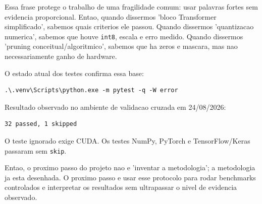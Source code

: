 Essa frase protege o trabalho de uma fragilidade comum: usar palavras fortes sem evidencia proporcional. Entao, quando dissermos 'bloco Transformer simplificado', sabemos quais criterios ele passou. Quando dissermos 'quantizacao numerica', sabemos que houve \texttt{int8}, escala e erro medido. Quando dissermos 'pruning conceitual/algoritmico', sabemos que ha zeros e mascara, mas nao necessariamente ganho de hardware.



O estado atual dos testes confirma essa base:



\begin{Verbatim}[fontsize=\small,breaklines=true,label=powershell]
.\.venv\Scripts\python.exe -m pytest -q -W error
\end{Verbatim}



Resultado observado no ambiente de validacao cruzada em 24/08/2026:



\begin{Verbatim}[fontsize=\small,breaklines=true,label=text]
32 passed, 1 skipped
\end{Verbatim}




O teste ignorado exige CUDA. Os testes NumPy, PyTorch e TensorFlow/Keras passaram sem \texttt{skip}.






Entao, o proximo passo do projeto nao e 'inventar a metodologia'; a metodologia ja esta desenhada. O proximo passo e usar esse protocolo para rodar benchmarks controlados e interpretar os resultados sem ultrapassar o nivel de evidencia observado.
